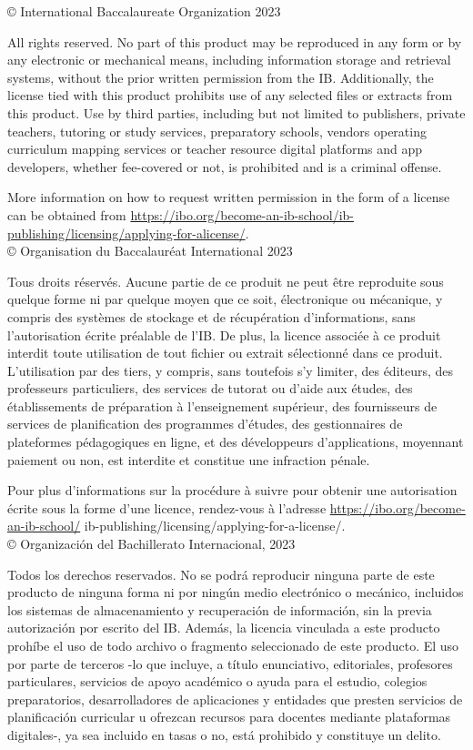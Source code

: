 \documentclass[10pt]{article}
\begin{document}
© International Baccalaureate Organization 2023

All rights reserved. No part of this product may be reproduced in any form or by any electronic or mechanical means, including information storage and retrieval systems, without the prior written permission from the IB. Additionally, the license tied with this product prohibits use of any selected files or extracts from this product. Use by third parties, including but not limited to publishers, private teachers, tutoring or study services, preparatory schools, vendors operating curriculum mapping services or teacher resource digital platforms and app developers, whether fee-covered or not, is prohibited and is a criminal offense.

More information on how to request written permission in the form of a license can be obtained from \href{https://ibo.org/become-an-ib-school/ib-publishing/licensing/applying-for-alicense/}{https://ibo.org/become-an-ib-school/ib-publishing/licensing/applying-for-alicense/}.\\
© Organisation du Baccalauréat International 2023

Tous droits réservés. Aucune partie de ce produit ne peut être reproduite sous quelque forme ni par quelque moyen que ce soit, électronique ou mécanique, y compris des systèmes de stockage et de récupération d'informations, sans l'autorisation écrite préalable de l'IB. De plus, la licence associée à ce produit interdit toute utilisation de tout fichier ou extrait sélectionné dans ce produit. L'utilisation par des tiers, y compris, sans toutefois s'y limiter, des éditeurs, des professeurs particuliers, des services de tutorat ou d'aide aux études, des établissements de préparation à l'enseignement supérieur, des fournisseurs de services de planification des programmes d'études, des gestionnaires de plateformes pédagogiques en ligne, et des développeurs d'applications, moyennant paiement ou non, est interdite et constitue une infraction pénale.

Pour plus d'informations sur la procédure à suivre pour obtenir une autorisation écrite sous la forme d'une licence, rendez-vous à l'adresse \href{https://ibo.org/become-an-ib-school/}{https://ibo.org/become-an-ib-school/} ib-publishing/licensing/applying-for-a-license/.\\
© Organización del Bachillerato Internacional, 2023

Todos los derechos reservados. No se podrá reproducir ninguna parte de este producto de ninguna forma ni por ningún medio electrónico o mecánico, incluidos los sistemas de almacenamiento y recuperación de información, sin la previa autorización por escrito del IB. Además, la licencia vinculada a este producto prohíbe el uso de todo archivo o fragmento seleccionado de este producto. El uso por parte de terceros -lo que incluye, a título enunciativo, editoriales, profesores particulares, servicios de apoyo académico o ayuda para el estudio, colegios preparatorios, desarrolladores de aplicaciones y entidades que presten servicios de planificación curricular u ofrezcan recursos para docentes mediante plataformas digitales-, ya sea incluido en tasas o no, está prohibido y constituye un delito.
\end{document}
